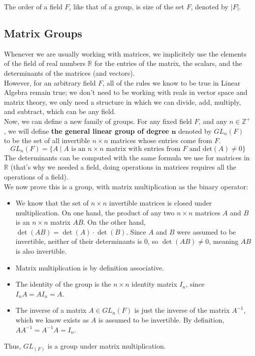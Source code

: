 \documentclass[12pt]{article}
\newcommand{\Z}{\mathbb{Z}}
\newcommand{\R}{\mathbb{R}}
\begin{document}
    The order of a field $F$, like that of a group,
    is size of the set $F$, denoted by $|F|$. \\

    \subsection*{Matrix Groups}

    Whenever we are usually working with matrices,
    we implicitely use the elements of the field of real numbers $\R$
    for the entries of the matrix,
    the scalars,
    and the determinants of the matrices (and vectors). \\
    However, for an arbitrary field $F$,
    all of the rules we know to be true in Linear Algebra remain true;
    we don't need to be working with reals
    in vector space and matrix theory,
    we only need a structure in which we can
    divide, add, multiply, and subtract,
    which can be any field. \\

    Now, we can define a new family of groups.
    For any fixed field $F$,
    and any $n \in \Z^+$,
    we will define
    \textbf{the general linear group of degree $\boldsymbol{n}$}
    denoted by $GL_n(F)$
    to be the set of all invertible $n \times n$ matrices
    whose entries come from $F$.
    \[ GL_n(F) = \{ A \mid A
    \text{ is an $n \times n$ matrix
    with entries from $F$ and det$(A) \neq 0$} \} \]
    The determinants can be computed with the same formula
    we use for matrices in $\R$
    (that's why we needed a field, doing operations in matrices
    requires all the operations of a field). \\

    We now prove this is a group, with matrix multiplication
    as the binary operator:
    \begin{itemize}[label=$\diamond$]
        \item 
            We know that the set of $n \times n$ invertible matrices
            is closed under multiplication.
            On one hand, the product of any two $n \times n$ matrices
            $A$ and $B$ is an $n \times n$ matrix $AB$.
            On the other hand, $\det(AB) = \det(A) \cdot \det(B)$.
            Since $A$ and $B$ were assumed to be invertible,
            neither of their determinants is $0$,
            so $\det(AB) \neq 0$,
            meaning $AB$ is also invertible. 
        \item 
            Matrix multiplication is by definition associative.
        \item 
            The identity of the group
            is the $n \times n$ identity matrix $I_n$,
            since $I_nA = AI_n = A$.
        \item 
            The inverse of a matrix $A \in GL_n(F)$
            is just the inverse of the matrix $A^{-1}$,
            which we know exists as $A$ is assumed to be invertible.
            By definition,
            $AA^{-1} = A^{-1}A = I_n$.
    \end{itemize}
    Thus, $GL_(F)$ is a group under matrix multiplication. \\
\end{document}
